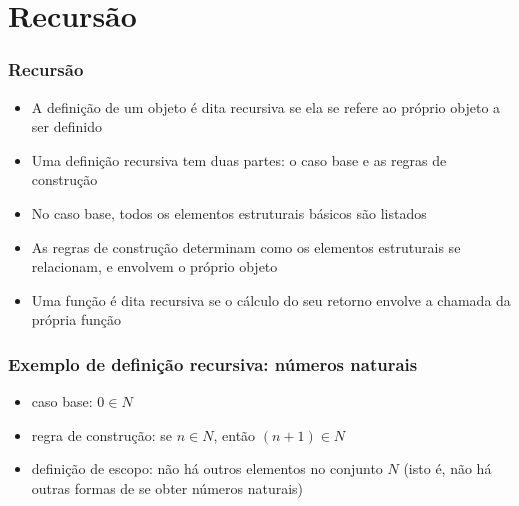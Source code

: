 \section{Recursão}

\begin{frame}
    \frametitle{Recursão}

    \begin{itemize}
        \item A definição de um objeto é dita {recursiva} se ela se 
        refere ao {próprio objeto} a ser definido
        
        \item Uma definição recursiva tem {duas} partes: o
        {caso base} e as {regras de construção} 

        \item No {caso base}, todos os {elementos estruturais 
        básicos} são listados

        \item As {regras de construção} determinam como os elementos
        estruturais se relacionam, e envolvem o {próprio objeto}

        \item Uma função é dita recursiva se o cálculo do seu retorno envolve a
            chamada da própria função
    \end{itemize}

\end{frame}

\begin{frame}

    \frametitle{Exemplo de definição recursiva: números naturais}

    \begin{itemize}
        \item {caso base:} $0\in N$ 

        \item {regra de construção:} se $n\in N$, então $(n+1)\in N$

        \item {definição de escopo:} {não há} outros elementos no 
        conjunto $N$ (isto é, não há {outras formas} de se obter números
        naturais)
    \end{itemize}

\end{frame}

